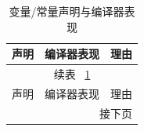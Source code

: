 \begin{longtable}[c]{lll}
    \caption{变量/常量声明与编译器表现}\label{tab:variable_constant}\\
    \toprule
    声明 & 编译器表现 & 理由 \\
    \midrule
    \endfirsthead          %

    \multicolumn{3}{c}{\footnotesize 续表~ \ref{tab:variable_constant} }\\[.5ex]
    \toprule
    声明 & 编译器表现 & 理由 \\
    \midrule
    \endhead               %

    \midrule
    \multicolumn{3}{r}{\footnotesize 接下页}
    \endfoot               %

    \bottomrule
    \endlastfoot           %


\end{longtable}
